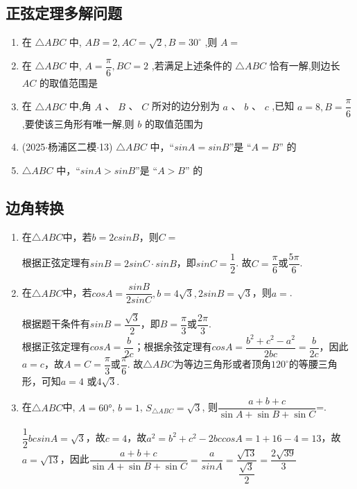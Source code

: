 \subsection*{正弦定理多解问题}
\begin{enumerate}
    \item 在 $\bigtriangleup  {ABC}$ 中, ${AB} = 2,{AC} = \sqrt{2},B = {30}^{ \circ  }$ ,则 $A =$
    \item 在 $\bigtriangleup  {ABC}$ 中, $A = \dfrac{\pi }{6},{BC} = 2$ ,若满足上述条件的 $\bigtriangleup  {ABC}$ 恰有一解,则边长 ${AC}$ 的取值范围是
    \item 在 $\bigtriangleup  {ABC}$ 中,角 $A$ 、 $B$ 、 $C$ 所对的边分别为 $a$ 、 $b$ 、 $c$ ,已知 $a = 8,B = \dfrac{\pi }{6}$ ,要使该三角形有唯一解,则 $b$ 的取值范围为\blkda[3]{$\{4\} \cup[8,+\infty)$}
    \item (2025$\cdot$杨浦区二模$\cdot$13) $\bigtriangleup  {ABC}$ 中，“$sinA = sinB$”是 “$A = B$” 的 
    \item $\bigtriangleup  {ABC}$ 中，“$sinA > sinB$”是 “$A > B$” 的 
\end{enumerate}
\subsection*{边角转换}
\begin{enumerate}
    \item 在$\triangle ABC$中，若$b = 2csinB$，则$C = $
    \begin{jieda}
        根据正弦定理有$sinB = 2sinC \cdot sinB$，即$sinC = \dfrac{1}{2}$. 故$C = \dfrac{\pi}{6}$或$\dfrac{5\pi}{6}$.
    \end{jieda}
    \item 在$\triangle ABC$中，若$cosA = \dfrac{sinB}{2sinC}, b = 4\sqrt{3}, 2sinB = \sqrt{3}$，则$a = $.
    \begin{jieda}
        根据题干条件有$sinB = \dfrac{\sqrt{3}}{2}$，即$B = \dfrac{\pi}{3}$或$\dfrac{2\pi}{3}$. \\
        根据正弦定理有$cosA = \dfrac{b}{2c}$；根据余弦定理有$cosA = \dfrac{b^2+c^2-a^2}{2bc} = \dfrac{b}{2c}$，因此$a = c$，故$A = C = \dfrac{\pi}{3}$或$\dfrac{\pi}{6}$. 故$\triangle ABC$为等边三角形或者顶角$120^{\circ}$的等腰三角形，可知$a = 4$ 或$4\sqrt{3}$.
    \end{jieda}
    \item 在$\triangle{ABC}$中, $A=\ang{60}$, $b=1$, $S_{\triangle{ABC}}=\sqrt{3}$, 则$\dfrac{a+b+c}{\sin{A}+\sin{B}+\sin{C}}$=. 
    \begin{jieda}
        $\dfrac{1}{2}bcsinA = \sqrt{3}$，故$c = 4$，故$a^2 = b^2+c^2-2bccosA = 1 + 16 - 4 = 13$，故$a = \sqrt{13}$，因此$\dfrac{a+b+c}{\sin{A}+\sin{B}+\sin{C}} = \dfrac{a}{sinA} = \dfrac{\sqrt{13}}{\dfrac{\sqrt{3}}{2}} = \dfrac{2\sqrt{39}}{3}$
    \end{jieda}
\end{enumerate}
